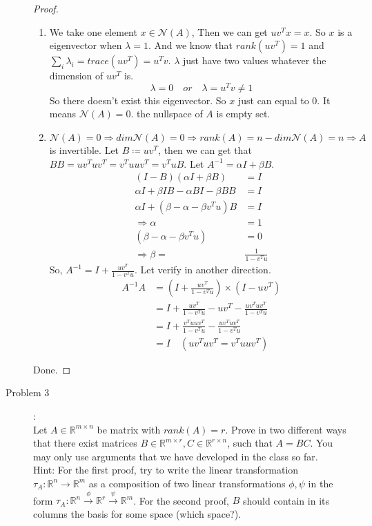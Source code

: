 \documentclass[a4paper]{article}
\begin{document}
\begin{description}
  \begin{proof}\
    \begin{enumerate}
      \item     We take one element $x \in \mathcal{N}(A)$, Then we can get $uv^{T}x=x$. So $x$ is a eigenvector when $\lambda=1$. And we know that $rank(uv^{T})=1$ and $\sum_{i}\lambda_{i}=trace(uv^{T})=u^{T}v$. $\lambda$ just have two values whatever the dimension of $uv^{T}$ is.
          \begin{equation*}
            \lambda=0 \quad or\quad \lambda=u^{T}v\ne 1
          \end{equation*}
          So there doesn't exist this eigenvector. So $x$ just can equal to $0$. It means $\mathcal{N}(A)=0$. the nullspace of $A$ is empty set.
      \item $\mathcal{N}(A)=0\Rightarrow dim\mathcal{N}(A)=0\Rightarrow rank(A)=n-dim\mathcal{N}(A)=n\Rightarrow A$ is invertible.
      Let $B\coloneqq uv^{T}$, then we can get that $BB=uv^{T}uv^{T}=v^{T}uuv^{T}=v^{T}uB$.
      Let $A^{-1}=\alpha I+\beta B$.
      \begin{align*}
        (I-B)(\alpha I+\beta B)&=I\\
        \alpha I +\beta IB-\alpha BI-\beta BB&=I\\
        \alpha I +(\beta-\alpha-\beta v^{T}u )B&=I\\
        \Rightarrow \alpha&=1\\
        (\beta-\alpha-\beta v^{T}u )&=0\\
        \Rightarrow \beta=&\frac{1}{1-v^{T}u}
      \end{align*}
      So, $A^{-1}=I+\frac{uv^{T}}{1-v^{T}u}$. Let verify in another direction.
      \begin{align*}
        A^{-1}A&=(I+\frac{uv^{T}}{1-v^{T}u}) \times (I - uv^{T})\\
        &=I +\frac{uv^{T}}{1-v^{T}u}-uv^{T}-\frac{uv^{T}uv^{T}}{1-v^{T}u}\\
        &=I+\frac{v^{T}uuv^{T}}{1-v^{T}u}-\frac{uv^{T}uv^{T}}{1-v^{T}u}\\
        &=I\quad (uv^{T}uv^{T}=v^{T}uuv^{T})
      \end{align*}
    \end{enumerate}
    Done.
  \end{proof}

  \item[Problem 3]:\\
   Let $A\in\mathbb{R}^{m\times n}$ be matrix with $rank(A) = r$.
  Prove in two different ways that there exist matrices $B\in\mathbb{R}^{m\times r},C\in\mathbb{R}^{r\times n}$, such that $A=BC$. You may only use arguments that we have developed in the class so far.\\
  Hint: For the first proof, try to write the linear transformation $\tau_A:\mathbb{R}^n\to\mathbb{R}^m$ as a composition of two linear transformations $\phi,\psi$ in the form
  $\tau_A:\mathbb{R}^n\xrightarrow{\phi}\mathbb{R}^r\xrightarrow{\psi}\mathbb{R}^m$. For the second proof, $B$ should contain in its columns the basis for some space (which space?).


\end{description}
\end{document}
